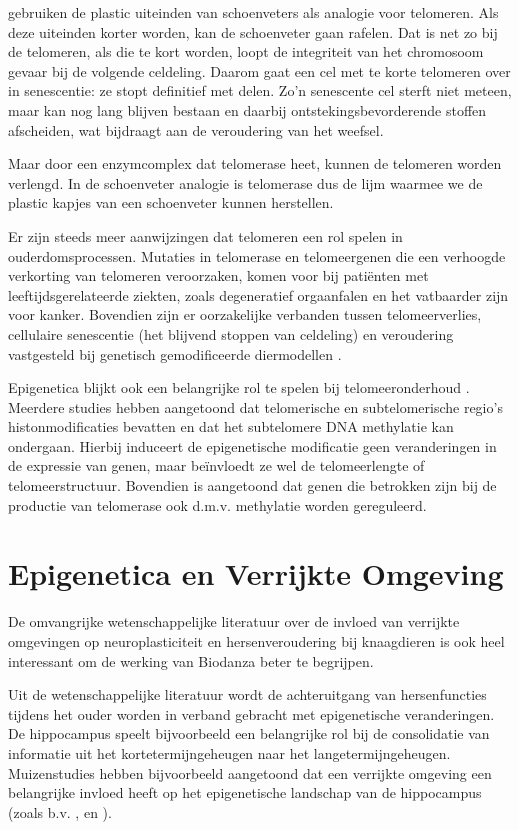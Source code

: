 \documentclass[
  11pt,
]{book}
\begin{document}
\citet{BlackburnEpel2017} gebruiken de plastic uiteinden van schoenveters als analogie voor telomeren. Als deze uiteinden korter worden, kan de schoenveter gaan rafelen. Dat is net zo bij de telomeren, als die te kort worden, loopt de integriteit van het chromosoom gevaar bij de volgende celdeling. Daarom gaat een cel met te korte telomeren over in senescentie: ze stopt definitief met delen. Zo'n senescente cel sterft niet meteen, maar kan nog lang blijven bestaan en daarbij ontstekingsbevorderende stoffen afscheiden, wat bijdraagt aan de veroudering van het weefsel.

Maar door een enzymcomplex dat telomerase heet, kunnen de telomeren worden verlengd. In de schoenveter analogie is telomerase dus de lijm waarmee we de plastic kapjes van een schoenveter kunnen herstellen.

Er zijn steeds meer aanwijzingen dat telomeren een rol spelen in ouderdomsprocessen. Mutaties in telomerase en telomeergenen die een verhoogde verkorting van telomeren veroorzaken, komen voor bij patiënten met leeftijdsgerelateerde ziekten, zoals degeneratief orgaanfalen en het vatbaarder zijn voor kanker. Bovendien zijn er oorzakelijke verbanden tussen telomeerverlies, cellulaire senescentie (het blijvend stoppen van celdeling) en veroudering vastgesteld bij genetisch gemodificeerde diermodellen \citep{Adwan2018}.

Epigenetica blijkt ook een belangrijke rol te spelen bij telomeeronderhoud \citep{Adwan2018}.
Meerdere studies hebben aangetoond dat telomerische en subtelomerische regio's histonmodificaties bevatten en dat het subtelomere DNA methylatie kan ondergaan.
Hierbij induceert de epigenetische modificatie geen veranderingen in de expressie van genen, maar beïnvloedt ze wel de telomeerlengte of telomeerstructuur.
Bovendien is aangetoond dat genen die betrokken zijn bij de productie van telomerase ook d.m.v. methylatie worden gereguleerd.

\section{Epigenetica en Verrijkte Omgeving}\label{epigenetica-en-verrijkte-omgeving}

De omvangrijke wetenschappelijke literatuur over de invloed van verrijkte omgevingen op neuroplasticiteit en hersenveroudering bij knaagdieren is ook heel interessant om de werking van Biodanza beter te begrijpen.

Uit de wetenschappelijke literatuur wordt de achteruitgang van hersenfuncties tijdens het ouder worden in verband gebracht met epigenetische veranderingen. De hippocampus speelt bijvoorbeeld een belangrijke rol bij de consolidatie van informatie uit het kortetermijngeheugen naar het langetermijngeheugen. Muizenstudies hebben bijvoorbeeld aangetoond dat een verrijkte omgeving een belangrijke invloed heeft op het epigenetische landschap van de hippocampus (zoals b.v. \citet{zocher2021}, en \citet{grinan2016}).
\end{document}
